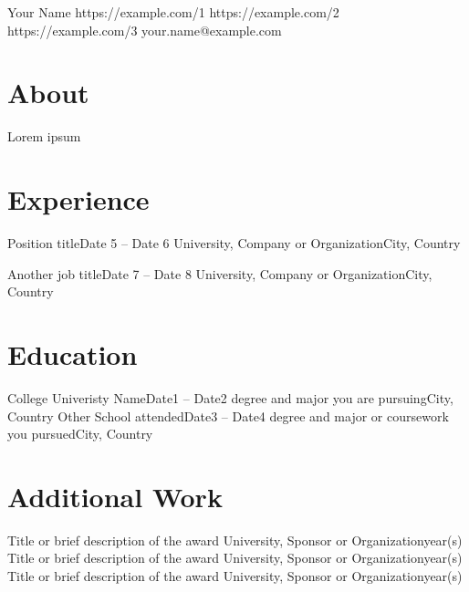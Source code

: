 \documentclass[a4paper,11pt]{article}
\begin{document}
\resumetitle
{Your Name}
{https://example.com/1}
{https://example.com/2}
{https://example.com/3}
{your.name@example.com}

\section{About}
Lorem ipsum

\section{Experience}
\resumeSubHeadingListStart

\resumeSubheading
{Position title}{Date 5 -- Date 6}
{University, Company or Organization}{City, Country}
\resumeItemListStart
\small{}
\resumeItemListEnd

\resumeSubheading
{Another job title}{Date 7 -- Date 8}
{University, Company or Organization}{City, Country}
\resumeItemListStart
\small{}
\resumeItemListEnd

\resumeSubHeadingListEnd

\section{Education}
\resumeSubHeadingListStart

\resumeSubheading
{College Univeristy Name}{Date1 -- Date2}
{degree and major you are pursuing}{City, Country}
\resumeSubheading
{Other School attended}{Date3 -- Date4}
{degree and major or coursework you pursued}{City, Country}

\resumeSubHeadingListEnd

\section{Additional Work}
\resumeSubHeadingListStart
\resumeSubheading
{Title or brief description of the award}{}
{University, Sponsor or Organization}{year(s)}
\resumeSubheading
{Title or brief description of the award}{}
{University, Sponsor or Organization}{year(s)}
\resumeSubheading
{Title or brief description of the award}{}
{University, Sponsor or Organization}{year(s)}
\resumeSubHeadingListEnd
\end{document}
